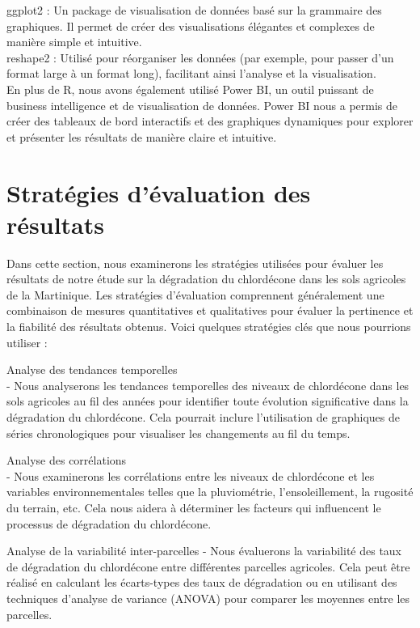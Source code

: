 \documentclass{report}
\begin{document}
ggplot2 : Un package de visualisation de données basé sur la grammaire des graphiques. Il permet de créer des visualisations élégantes et complexes de manière simple et intuitive.\\

reshape2 : Utilisé pour réorganiser les données (par exemple, pour passer d'un format large à un format long), facilitant ainsi l'analyse et la visualisation.
\\
En plus de R, nous avons également utilisé Power BI, un outil puissant de business intelligence et de visualisation de données. Power BI nous a permis de créer des tableaux de bord interactifs et des graphiques dynamiques pour explorer et présenter les résultats de manière claire et intuitive.
\\
\section{Stratégies d'évaluation des résultats}

Dans cette section, nous examinerons les stratégies utilisées pour évaluer les résultats de notre étude sur la dégradation du chlordécone dans les sols agricoles de la Martinique. Les stratégies d'évaluation comprennent généralement une combinaison de mesures quantitatives et qualitatives pour évaluer la pertinence et la fiabilité des résultats obtenus. Voici quelques stratégies clés que nous pourrions utiliser :

Analyse des tendances temporelles \\
   - Nous analyserons les tendances temporelles des niveaux de chlordécone dans les sols agricoles au fil des années pour identifier toute évolution significative dans la dégradation du chlordécone. Cela pourrait inclure l'utilisation de graphiques de séries chronologiques pour visualiser les changements au fil du temps.

Analyse des corrélations\\
   - Nous examinerons les corrélations entre les niveaux de chlordécone et les variables environnementales telles que la pluviométrie, l'ensoleillement, la rugosité du terrain, etc. Cela nous aidera à déterminer les facteurs qui influencent le processus de dégradation du chlordécone.


Analyse de la variabilité inter-parcelles
   - Nous évaluerons la variabilité des taux de dégradation du chlordécone entre différentes parcelles agricoles. Cela peut être réalisé en calculant les écarts-types des taux de dégradation ou en utilisant des techniques d'analyse de variance (ANOVA) pour comparer les moyennes entre les parcelles.
\end{document}
